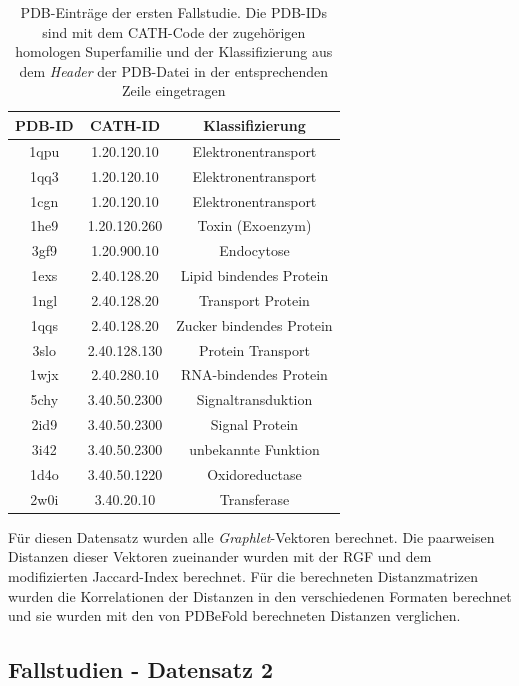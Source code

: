 \documentclass{report}
\begin{document}
\begin{table}[h!]
\label{tab:set1}
\begin{tabular}{ | c || c | c |}

\hline
PDB-ID & CATH-ID        & Klassifizierung      \\ \hline
1qpu   & 1.20.120.10 & Elektronentransport     \\ \hline
1qq3   & 1.20.120.10 & Elektronentransport     \\ \hline
1cgn   & 1.20.120.10 & Elektronentransport     \\ \hline
1he9   & 1.20.120.260& Toxin (Exoenzym)        \\ \hline
3gf9   & 1.20.900.10 & Endocytose              \\ \hline
1exs   & 2.40.128.20 & Lipid bindendes Protein \\ \hline
1ngl   & 2.40.128.20 & Transport Protein       \\ \hline
1qqs   & 2.40.128.20 & Zucker bindendes Protein\\ \hline
3slo   & 2.40.128.130& Protein Transport       \\ \hline
1wjx   & 2.40.280.10 & RNA-bindendes Protein   \\ \hline
5chy   & 3.40.50.2300& Signaltransduktion      \\ \hline
2id9   & 3.40.50.2300& Signal Protein          \\ \hline
3i42   & 3.40.50.2300& unbekannte Funktion     \\ \hline
1d4o   & 3.40.50.1220& Oxidoreductase          \\ \hline
2w0i   & 3.40.20.10  & Transferase             \\ 
\hline
\end{tabular}
\caption{PDB-Eintr\"age der ersten Fallstudie. Die PDB-IDs sind mit dem CATH-Code der zugeh\"origen homologen Superfamilie und der Klassifizierung aus dem \textit{Header} der PDB-Datei in der entsprechenden Zeile eingetragen}
\end{table}

F\"ur diesen Datensatz wurden alle \textit{Graphlet}-Vektoren berechnet. Die paarweisen Distanzen dieser Vektoren zueinander wurden mit der RGF und dem modifizierten Jaccard-Index berechnet. F\"ur die berechneten Distanzmatrizen wurden die Korrelationen der Distanzen in den verschiedenen Formaten berechnet und sie wurden mit den von PDBeFold berechneten Distanzen verglichen. 


\subsection{Fallstudien - Datensatz 2}
\end{document}
